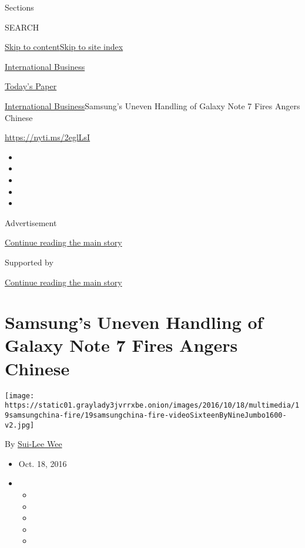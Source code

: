Sections

SEARCH

\protect\hyperlink{site-content}{Skip to
content}\protect\hyperlink{site-index}{Skip to site index}

\href{https://www.nytimes3xbfgragh.onion/section/business}{International
Business}

\href{https://myaccount.nytimes3xbfgragh.onion/auth/login?response_type=cookie\&client_id=vi}{}

\href{https://www.nytimes3xbfgragh.onion/section/todayspaper}{Today's
Paper}

\href{/section/business}{International Business}\textbar{}Samsung's
Uneven Handling of Galaxy Note 7 Fires Angers Chinese

\url{https://nyti.ms/2eglLsI}

\begin{itemize}
\item
\item
\item
\item
\item
\end{itemize}

Advertisement

\protect\hyperlink{after-top}{Continue reading the main story}

Supported by

\protect\hyperlink{after-sponsor}{Continue reading the main story}

\hypertarget{samsungs-uneven-handling-of-galaxy-note-7-fires-angers-chinese}{%
\section{Samsung's Uneven Handling of Galaxy Note 7 Fires Angers
Chinese}\label{samsungs-uneven-handling-of-galaxy-note-7-fires-angers-chinese}}

\texttt{[image: https://static01.graylady3jvrrxbe.onion/images/2016/10/18/multimedia/19samsungchina-fire/19samsungchina-fire-videoSixteenByNineJumbo1600-v2.jpg]}

By \href{https://www.nytimes3xbfgragh.onion/by/sui-lee-wee}{Sui-Lee Wee}

\begin{itemize}
\item
  Oct. 18, 2016
\item
  \begin{itemize}
  \item
  \item
  \item
  \item
  \item
  \end{itemize}
\end{itemize}

